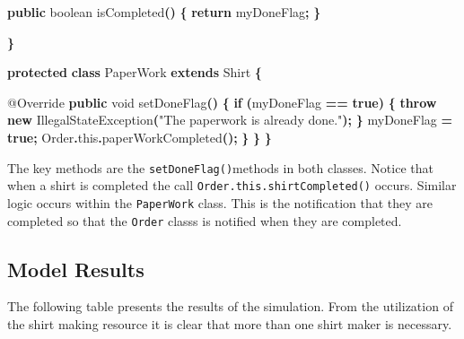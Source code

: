 \documentclass[
]{book}
\newenvironment{Shaded}{\begin{snugshade}}{\end{snugshade}}
\newcommand{\AttributeTok}[1]{\textcolor[rgb]{0.77,0.63,0.00}{#1}}
\newcommand{\BuiltInTok}[1]{#1}
\newcommand{\ControlFlowTok}[1]{\textcolor[rgb]{0.13,0.29,0.53}{\textbf{#1}}}
\newcommand{\DataTypeTok}[1]{\textcolor[rgb]{0.13,0.29,0.53}{#1}}
\newcommand{\FunctionTok}[1]{\textcolor[rgb]{0.00,0.00,0.00}{#1}}
\newcommand{\KeywordTok}[1]{\textcolor[rgb]{0.13,0.29,0.53}{\textbf{#1}}}
\newcommand{\NormalTok}[1]{#1}
\newcommand{\OperatorTok}[1]{\textcolor[rgb]{0.81,0.36,0.00}{\textbf{#1}}}
\newcommand{\StringTok}[1]{\textcolor[rgb]{0.31,0.60,0.02}{#1}}
\theoremstyle{definition}
\theoremstyle{definition}
\theoremstyle{definition}
\theoremstyle{definition}
\theoremstyle{remark}
\begin{document}
\begin{Shaded}
\begin{Highlighting}[]
            \KeywordTok{public} \DataTypeTok{boolean} \FunctionTok{isCompleted}\OperatorTok{()} \OperatorTok{\{}
                \ControlFlowTok{return}\NormalTok{ myDoneFlag}\OperatorTok{;}
            \OperatorTok{\}}

        \OperatorTok{\}}

        \KeywordTok{protected} \KeywordTok{class}\NormalTok{ PaperWork }\KeywordTok{extends}\NormalTok{ Shirt }\OperatorTok{\{}

            \AttributeTok{@Override}
            \KeywordTok{public} \DataTypeTok{void} \FunctionTok{setDoneFlag}\OperatorTok{()} \OperatorTok{\{}
                \ControlFlowTok{if} \OperatorTok{(}\NormalTok{myDoneFlag }\OperatorTok{==} \KeywordTok{true}\OperatorTok{)} \OperatorTok{\{}
                    \ControlFlowTok{throw} \KeywordTok{new} \BuiltInTok{IllegalStateException}\OperatorTok{(}\StringTok{"The paperwork is already done."}\OperatorTok{);}
                \OperatorTok{\}}
\NormalTok{                myDoneFlag }\OperatorTok{=} \KeywordTok{true}\OperatorTok{;}
\NormalTok{                Order}\OperatorTok{.}\FunctionTok{this}\OperatorTok{.}\FunctionTok{paperWorkCompleted}\OperatorTok{();}
            \OperatorTok{\}}
        \OperatorTok{\}}
    \OperatorTok{\}}
\end{Highlighting}
\end{Shaded}

The key methods are the \texttt{setDoneFlag()}methods in both classes. Notice that
when a shirt is completed the call \texttt{Order.this.shirtCompleted()} occurs.
Similar logic occurs within the \texttt{PaperWork} class. This is the
notification that they are completed so that the \texttt{Order} classs is
notified when they are completed.

\hypertarget{dem:tiedyeShirts:results}{%
\subsection{Model Results}\label{dem:tiedyeShirts:results}}

The following table presents the results of the simulation. From
the utilization of the shirt making resource it is clear that more than
one shirt maker is necessary.
\end{document}
